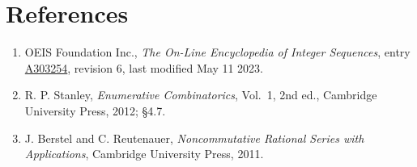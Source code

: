 \documentclass[11pt]{article}
\theoremstyle{definition}
\begin{document}
\section{References}

\begin{enumerate}

\item OEIS Foundation Inc., \emph{The On-Line Encyclopedia of Integer Sequences}, entry \href{https://oeis.org/A303254}{A303254}, revision 6, last modified May 11 2023.

\item R. P. Stanley, \emph{Enumerative Combinatorics}, Vol.~1, 2nd ed., Cambridge University Press, 2012; \S4.7.

\item J. Berstel and C. Reutenauer, \emph{Noncommutative Rational Series with Applications}, Cambridge University Press, 2011.

\end{enumerate}
\end{document}
